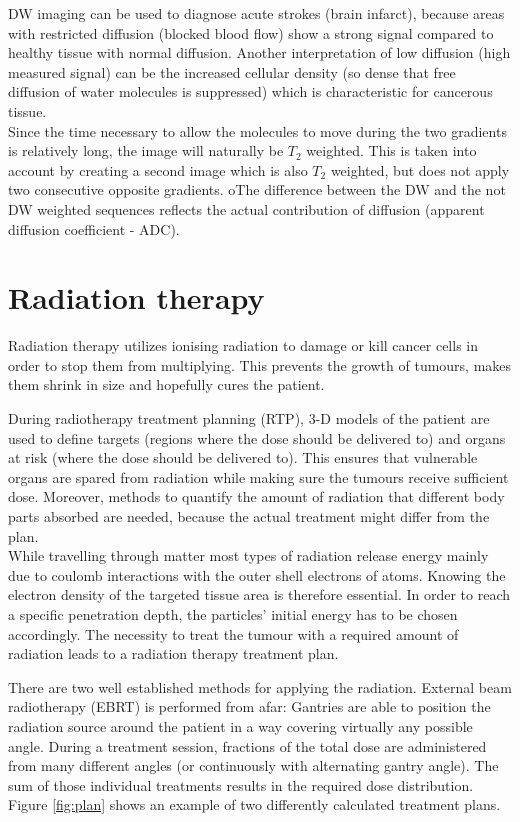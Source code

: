 DW imaging can be used to diagnose acute strokes (brain infarct), because areas with restricted diffusion (blocked blood flow) show a strong signal compared to healthy tissue with normal diffusion.
Another interpretation of low diffusion (high measured signal) can be the increased cellular density (so dense that free diffusion of water molecules is suppressed) which is characteristic for cancerous tissue.\\

Since the time necessary to allow the molecules to move during the two gradients is relatively long, the image will naturally be $T_2$ weighted.
This is taken into account by creating a second image which is also $T_2$ weighted, but does not apply two consecutive opposite gradients.
oThe difference between the DW and the not DW weighted sequences reflects the actual contribution of diffusion (apparent diffusion coefficient - ADC). \cite{McRobbie2006}


\section{Radiation therapy}
\label{sec:planning}
Radiation therapy utilizes ionising radiation to damage or kill cancer cells in order to stop them from multiplying.
This prevents the growth of tumours, makes them shrink in size and hopefully cures the patient. 

During radiotherapy treatment planning (RTP), 3-D models of the patient are used to define targets (regions where the dose should be delivered to) and organs at risk (where the dose should be delivered to).
This ensures that vulnerable organs are spared from radiation while making sure the tumours receive sufficient dose.
Moreover, methods to quantify the amount of radiation that different body parts absorbed are needed, because the actual treatment might differ from the plan.\\

While travelling through matter most types of radiation release energy mainly due to coulomb interactions with the outer shell electrons of atoms.
Knowing the electron density of the targeted tissue area is therefore essential.
In order to reach a specific penetration depth, the particles' initial energy has to be chosen accordingly.
The necessity to treat the tumour with a required amount of radiation leads to a radiation therapy treatment plan.

There are two well established methods for applying the radiation.
External beam radiotherapy (EBRT) is performed from afar:
Gantries are able to position the radiation source around the patient in a way covering virtually any possible angle.
During a treatment session, fractions of the total dose are administered from many different angles (or continuously with alternating gantry angle).
The sum of those individual treatments results in the required dose distribution.
Figure \ref{fig:plan} shows an example of two differently calculated treatment plans.

